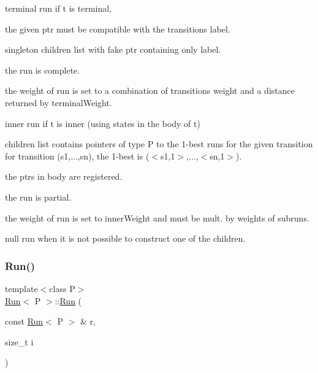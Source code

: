 \begin{DoxyItemize}
\item terminal run if t is terminal,
\begin{DoxyItemize}
\item the given ptr must be compatible with the transition\textquotesingle{}s label.
\item singleton children list with fake ptr containing only label.
\item the run is complete.
\item the weight of run is set to a combination of transition\textquotesingle{}s weight and a distance returned by terminal\+Weight.
\end{DoxyItemize}
\item inner run if t is inner (using states in the body of t)
\begin{DoxyItemize}
\item children list contains pointers of type P to the 1-\/best runs for the given transition for transition (s1,...,sn), the 1-\/best is ($<$s1,1$>$,...,$<$sn,1$>$).
\item the ptrs in body are registered.
\item the run is partial.
\item the weight of run is set to inner\+Weight and must be mult. by weights of subruns.
\end{DoxyItemize}
\item null run when it is not possible to construct one of the children. 
\end{DoxyItemize}\mbox{\label{classRun_ae14a444c0e91801d76f5138a36da435d}} 
\subsubsection{\texorpdfstring{Run()}{Run()}\hspace{0.1cm}{\footnotesize\ttfamily [3/4]}}
{\footnotesize\ttfamily template$<$class P$>$ \\
\mbox{\hyperlink{classRun}{Run}}$<$ P $>$\+::\mbox{\hyperlink{classRun}{Run}} (\begin{DoxyParamCaption}\item[{const \mbox{\hyperlink{classRun}{Run}}$<$ P $>$ \&}]{r,  }\item[{size\+\_\+t}]{i }\end{DoxyParamCaption})}



